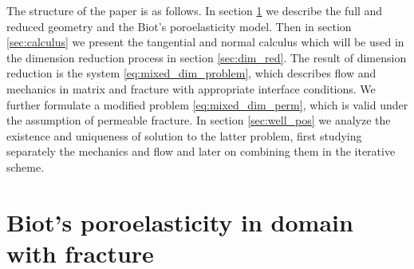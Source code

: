 \documentclass[a4paper]{article}
\numberwithin{equation}{section}
\begin{document}
The structure of the paper is as follows.
In section \ref{sec:model} we describe the full and reduced geometry and the Biot's poroelasticity model.
Then in section \ref{sec:calculus} we present the tangential and normal calculus which will be used in the dimension reduction process in section \ref{sec:dim_red}.
The result of dimension reduction is the system \eqref{eq:mixed_dim_problem}, which describes flow and mechanics in matrix and fracture with appropriate interface conditions.
We further formulate a modified problem \eqref{eq:mixed_dim_perm}, which is valid under the assumption of permeable fracture.
In section \ref{sec:well_pos} we analyze the existence and uniqueness of solution to the latter problem, first studying separately the mechanics and flow and later on combining them in the iterative scheme.


\section{Biot's poroelasticity in domain with fracture}\label{sec:model}
\end{document}
